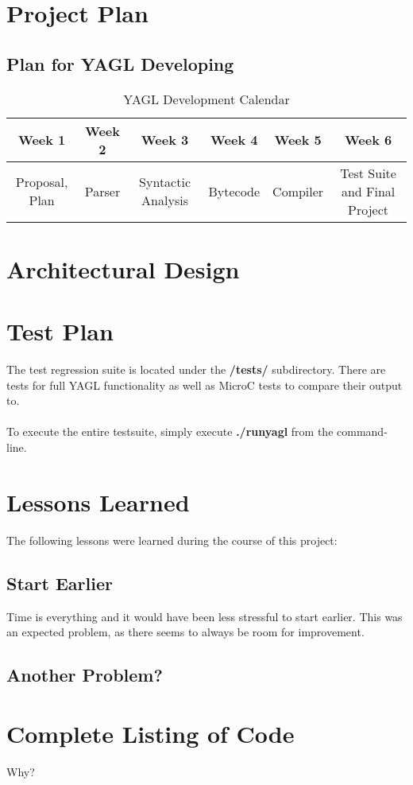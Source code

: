 \documentclass[12pt]{article}
\begin{document}
\section{Project Plan}
\subsection{Plan for YAGL Developing }
\begin{table}[H]
\caption{YAGL Development Calendar}
\centering
\begin{tabular}{c c c c c c}

\textbf{Week 1} & \textbf{Week 2} & \textbf{Week 3} & \textbf{Week 4} & \textbf{Week 5} & \textbf{Week 6}\\ [0.5ex] %
\hline
Proposal, Plan&Parser&Syntactic Analysis&Bytecode&Compiler&Test Suite and Final Project \\

\hline
\end{tabular}
\end{table}
\section{Architectural Design}
\section{Test Plan}
The test regression suite is located under the \textbf{/tests/} subdirectory. There are tests for full YAGL functionality as well as MicroC tests to compare their output to.\\\\

To execute the entire testsuite, simply execute \textbf{./runyagl} from the command-line.

\section{Lessons Learned}
The following lessons were learned during the course of this project:\\

\subsection{Start Earlier}
Time is everything and it would have been less stressful to start earlier. This was an expected problem, as there seems to always be room for improvement.

\subsection{Another Problem?}


\section{Complete Listing of Code}
Why?
\end{document}
